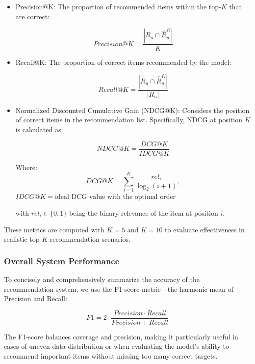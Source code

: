 \documentclass{ieeeaccess}
\begin{document}
\begin{itemize}
    \item Precision@K: The proportion of recommended items within the top-$K$ that are correct:

    \begin{equation}
    Precision@K = \frac{|R_u \cap \hat{R}_u^K|}{K}
    \end{equation}

    \item Recall@K: The proportion of correct items recommended by the model:

    \begin{equation}
    Recall@K = \frac{|R_u \cap \hat{R}_u^K|}{|R_u|}
    \end{equation}

    \item Normalized Discounted Cumulative Gain (NDCG@K): Considers the position of correct items in the recommendation list. Specifically, NDCG at position \( K \) is calculated as:

    \begin{equation}
    NDCG@K = \frac{DCG@K}{IDCG@K}
    \end{equation}

    Where:
    \begin{equation}
    DCG@K = \sum_{i=1}^{K} \frac{rel_i}{\log_2(i + 1)},
    \end{equation}
    \(IDCG@K = \text{ideal DCG value with the optimal order}\)

    with \( rel_i \in \{0,1\} \) being the binary relevance of the item at position \( i \).
\end{itemize}

These metrics are computed with \( K = 5 \) and \( K = 10 \) to evaluate effectiveness in realistic top-$K$ recommendation scenarios.

\subsubsection{Overall System Performance}

To concisely and comprehensively summarize the accuracy of the recommendation system, we use the F1-score metric—the harmonic mean of Precision and Recall:

\begin{equation}
F1 = 2 \cdot \frac{Precision \cdot Recall}{Precision + Recall}
\end{equation}

The F1-score balances coverage and precision, making it particularly useful in cases of uneven data distribution or when evaluating the model’s ability to recommend important items without missing too many correct targets.
\end{document}
